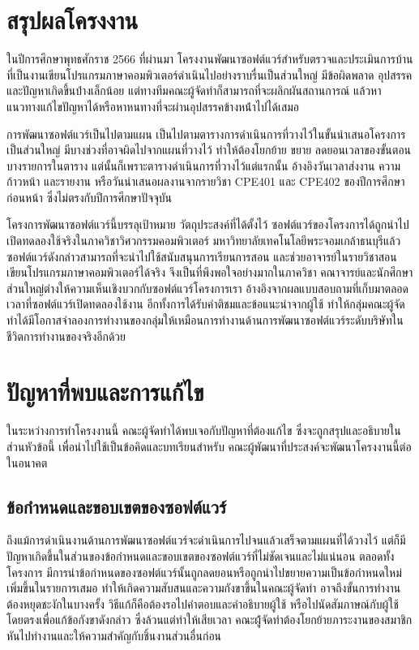 \documentclass[12pt,one side,openright,a4paper]{cpe-thesis-th}
\newcommand{\thaijustify}[1]{%
  \par\hspace{30pt}\justifying
  #1
}
\begin{document}
\section{สรุปผลโครงงาน}
\thaijustify{
  ในปีการศึกษาพุทธศักราช 2566 ที่ผ่านมา โครงงานพัฒนาซอฟต์แวร์สำหรับตรวจและประเมินการบ้านที่เป็นงานเขียนโปรแกรมภาษาคอมพิวเตอร์ดำเนินไปอย่างราบรื่นเป็นส่วนใหญ่ มีข้อผิดพลาด อุปสรรคและปัญหาเกิดขึ้นบ้่างเล็กน้อย แต่ทางทีมคณะผู้จัดทำก็สามารถที่จะผลิกผันสถานการณ์ แล้วหาแนวทางแก้ไขปัญหาได้หรือหาหนทางที่จะผ่านอุปสรรคข้างหน้่าไปได้เสมอ
}
\thaijustify{
  การพัฒนาซอฟต์แวร์เป็นไปตามแผน เป็นไปตามตารางการดำเนินการที่วางไว้ในขั้นนำเสนอโครงการเป็นส่วนใหญ่ มีบางช่วงที่อาจผิดไปจากแผนที่วางไว้ ทำให้ต้องโยกย้าย ขยาย ลดยอนเวลาของขั้นตอนบางรายการในตาราง แต่นั้นก็เพราะตารางดำเนินการที่วางไว้แต่แรกนั้น อ้างอิงวันเวลาส่งงาน ความก้าวหน้า และรายงาน หรือวันนำเสนอผลงานจากรายวิชา CPE401 และ CPE402 ของปีการศึกษาก่อนหน้า ซึ่งไม่ตรงกับปีการศีกษาปัจจุบัน
}
\thaijustify{
  โครงการพัฒนาซอฟต์แวร์นี้บรรลุเป้าหมาย วัตถุประสงค์ที่ได้ตั้งไว้ ซอฟต์แวร์ของโครงการได้ถูกนำไปเปิดทดลองใช้จริงในภาควิชาวิศวกรรมคอมพิวเตอร์ มหาวิทยาลัยเทคโนโลยีพระจอมเกล้าธนบุรีแล้ว ซอฟต์แวร์ดังกล่าวสามารถที่จะนำไปใช้สนับสนุนการเรียนการสอน และช่วยอาจารย์ในรายวิชาสอนเขียนโปรแกรมภาษาคอมพิวเตอร์ได้จริง จึงเป็นที่พึงพอใจอย่างมากในภาควิชา คณาจารย์และนักศึกษาส่วนใหญ่ต่างให้ความเห็นเชิงบวกกับซอฟต์แวร์โครงการเรา อ้างอิงจากผลแบบสอบถามที่เก็บมาตลอดเวลาที่ซอฟต์แวร์เปิดทดลองใช้งาน อีกทั้งการได้รับคำติชมและข้อแนะนำจากผู้ใช้ ทำให้กลุ่มคณะผู้จัดทำได้มีโอกาสจำลองการทำงานของกลุ่มให้เหมือนการทำงานด้านการพัฒนาซอฟต์แวร์ระดับบริษัทในชีวิตการทำงานของจริงอีกด้วย
}
\section{ปัญหาที่พบและการแก้ไข}
ในระหว่างการทำโครงงานนี้ คณะผู้จัดทำได้พบเจอกับปัญหาที่ต้องแก้ไข ซึ่งจะถูกสรุปและอธิบายในส่วนหัวข้อนี้ เพื่อนำไปใช้เป็นข้อคิดและบทเรียนสำหรับ คณะผู้พัฒนาที่ประสงค์จะพัฒนาโครงงานนี้ต่อในอนาคต
\subsection{ข้อกำหนดและขอบเขตของซอฟต์แวร์}
\thaijustify{
  ถึงแม้การดำเนินงานด้านการพัฒนาซอฟต์แวร์จะดำเนินการไปจนแล้วเสร็จตามแผนที่ได้วางไว้ แต่ก็มีปัญหาเกิดขึ้นในส่วนของข้อกำหนดและขอบเขตของซอฟต์แวร์ที่ไม่ชัดเจนและไม่แน่นอน ตลอดทั้งโครงการ มีการนำข้อกำหนดของซอฟต์แวร์นั้นถูกลดยอนหรือถูกนำไปขยายความเป็นข้อกำหนดใหม่เพิ่มขึ้นในรายการเสมอ ทำให้เกิดความสับสนและความกังขาขึ้นในคณะผู้จัดทำ อาจถึงขั้นการทำงานต้องหยุดชะงักในบางครั้ง วิธีแก้ก็คือต้องรอไปคำตอบและคำอธิบายผู้ใช้ หรือไปนัดสัมภาษณ์กับผู้ใช้โดยตรงเพื่อแก้ข้อกังขาดังกล่าว ซึ่งล้วนแต่ทำให้เสียเวลา คณะผู้้จัดทำต้องโยกย้ายภาระงานของสมาชิก หันไปทำงานและให้ความสำคัญกับชิ้นงานส่วนอื่นก่อน
}
\end{document}
